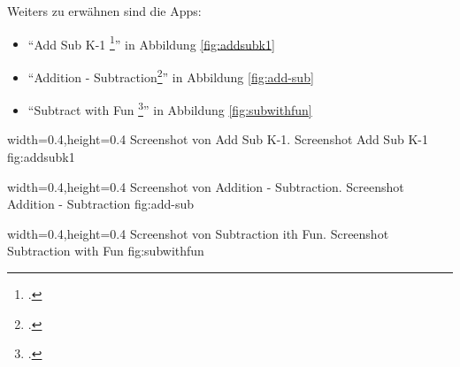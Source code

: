Weiters zu erwähnen sind die Apps:
\begin{itemize}
\item \enquote{Add Sub K-1 \footcite{https://itunes.apple.com/de/app/add-sub-k-1/id486199509?mt=8}}
in Abbildung \ref{fig:addsubk1}
\item \enquote{Addition - Subtraction\footcite{https://itunes.apple.com/de/app/addition-subtraction/id542109601?mt=8}}
in Abbildung \ref{fig:add-sub}
\item \enquote{Subtract with Fun \footcite{https://itunes.apple.com/de/app/subtract-with-fun/id699563137?mt=8}}
in Abbildung \ref{fig:subwithfun}

\end{itemize}

  {width=0.4\textwidth,height=0.4\textheight}%
  {Screenshot von Add Sub K-1.}%
  {Screenshot Add Sub K-1}%
  {fig:addsubk1}%

  {width=0.4\textwidth,height=0.4\textheight}%
  {Screenshot von Addition - Subtraction.}%
  {Screenshot Addition - Subtraction}%
  {fig:add-sub}%
  
  {width=0.4\textwidth,height=0.4\textheight}%
  {Screenshot von Subtraction ith Fun.}%
  {Screenshot Subtraction with Fun}%
  {fig:subwithfun}%




